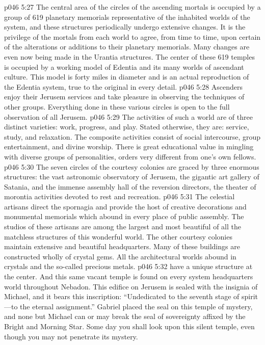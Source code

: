 \pc \vs p046 5:27 \bibnobreakspace {} The central area of the circles of the ascending mortals is occupied by a group of 619 planetary memorials representative of the inhabited worlds of the system, and these structures periodically undergo extensive changes. It is the privilege of the mortals from each world to agree, from time to time, upon certain of the alterations or additions to their planetary memorials. Many changes are even now being made in the Urantia structures. The center of these 619 temples is occupied by a working model of Edentia and its many worlds of ascendant culture. This model is forty miles in diameter and is an actual reproduction of the Edentia system, true to the original in every detail.
\vs p046 5:28 Ascenders enjoy their Jerusem services and take pleasure in observing the techniques of other groups. Everything done in these various circles is open to the full observation of all Jerusem.
\vs p046 5:29 The activities of such a world are of three distinct varieties: work, progress, and play. Stated otherwise, they are: service, study, and relaxation. The composite activities consist of social intercourse, group entertainment, and divine worship. There is great educational value in mingling with diverse groups of personalities, orders very different from one’s own fellows.
\pc \vs p046 5:30 \bibnobreakspace {} The seven circles of the courtesy colonies are graced by three enormous structures: the vast astronomic observatory of Jerusem, the gigantic art gallery of Satania, and the immense assembly hall of the reversion directors, the theater of morontia activities devoted to rest and recreation.
\vs p046 5:31 The celestial artisans direct the spornagia and provide the host of creative decorations and monumental memorials which abound in every place of public assembly. The studios of these artisans are among the largest and most beautiful of all the matchless structures of this wonderful world. The other courtesy colonies maintain extensive and beautiful headquarters. Many of these buildings are constructed wholly of crystal gems. All the architectural worlds abound in crystals and the so\hyp{}called precious metals.
\pc \vs p046 5:32 \bibnobreakspace {} have a unique structure at the center. And this same vacant temple is found on every system headquarters world throughout Nebadon. This edifice on Jerusem is sealed with the insignia of Michael, and it bears this inscription: “Undedicated to the seventh stage of spirit---to the eternal assignment.” Gabriel placed the seal on this temple of mystery, and none but Michael can or may break the seal of sovereignty affixed by the Bright and Morning Star. Some day you shall look upon this silent temple, even though you may not penetrate its mystery.
